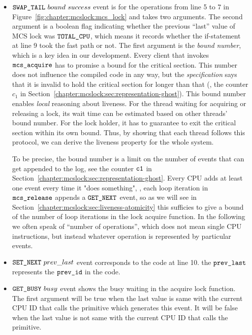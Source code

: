 \begin{itemize}

\item \textbf{${{\mathrm{\texttt{SWAP\_TAIL}}}~{bound}~{success}}$} event is for the
operations from line 5 to 7 in Figure~\ref{fig:chapter:mcslock:mcs_lock} and takes
two arguments. The second argument is a boolean flag indicating
whether the previous ``last'' value of MCS lock was ${\mathrm{\texttt{TOTAL\_CPU}}}$,
which means it records whether the if-statement at line 9 took the fast path or not.
The first argument is the \emph{bound number}, which is a key idea in
our development. Every client that invokes ${\mathrm{\texttt{mcs\_acquire}}}$ has
to promise a bound for the critical section. This number
does not influence the compiled code in any way, but the
\emph{specification} says that it is invalid to hold the critical
section for longer than that (\cf,  the counter $c_1$ in
Section~\ref{chapter:mcslock:sec:representation-ghost}).
This bound number enables \emph{local} reasoning about liveness.
For the thread waiting for acquiring or releasing a lock,
its wait time can be estimated based on other threads' bound number. For the lock holder, it has to guarantee
to exit the critical section within its own bound. 
Thus, by showing that each thread follows this protocol,
we can derive the liveness property for the whole system.

To be precise, the bound number is a limit on the number of events
that can get appended to the log, see the counter ${\mathrm{\texttt{c1}}}$ in
Section~\ref{chapter:mcslock:sec:representation-ghost}.
Every CPU adds at least
one event every time it "does something", \eg, each loop iteration in ${\mathrm{\texttt{mcs\_release}}}$ appends a ${\mathrm{\texttt{GET\_NEXT}}}$
event, so
as we will see in
Section~\ref{chapter:mcslock:sec:liveness-atomicity} this sufficies to give a bound of
the number of loop iterations in the lock acquire function. In the following we often speak of
``number of operations'', which does not mean single CPU instructions,
but instead whatever operation is represented by particular events.


\item \textbf{${\mathrm{\texttt{SET\_NEXT}}}~{prev\_last}$} event corresponds to the code at line 10. 
the ${\mathrm{\texttt{prev\_last}}}$ represents the ${\mathrm{\texttt{prev\_id}}}$ in the code.

\item\textbf{${\mathrm{\texttt{GET\_BUSY}}}~{busy}$} event shows the busy waiting in the acquire lock function.
The first argument will be true when the last value is same with the current CPU ID that calls the primitive which generates this event.
It will be false when the last value is not same with the current CPU ID that calls the primitive.
\end{itemize}

